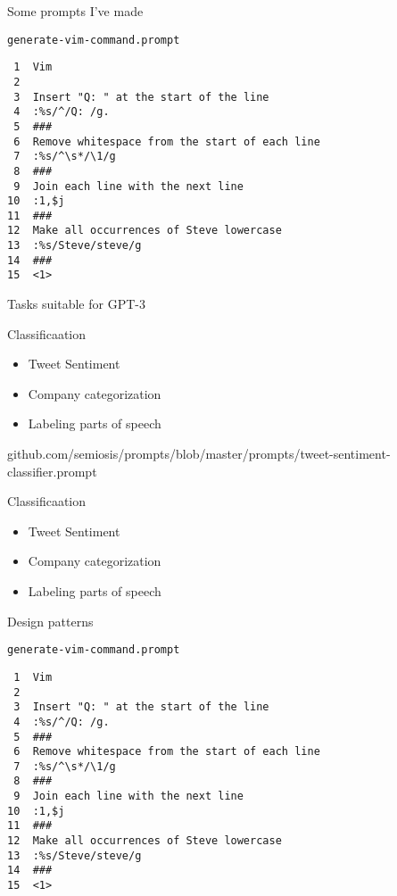 \documentclass[presentation]{beamer}
\begin{document}
\begin{frame}[label={sec:org28ea63d},fragile]{Some prompts I've made}
 \begin{block}{\texttt{generate-vim-command.prompt}}
{\footnotesize
\begin{verbatim}
 1  Vim
 2  
 3  Insert "Q: " at the start of the line
 4  :%s/^/Q: /g.
 5  ###
 6  Remove whitespace from the start of each line
 7  :%s/^\s*/\1/g
 8  ###
 9  Join each line with the next line
10  :1,$j
11  ###
12  Make all occurrences of Steve lowercase
13  :%s/Steve/steve/g
14  ###
15  <1>
\end{verbatim}
}
\end{block}
\end{frame}

\begin{frame}[label={sec:orga0109bc}]{Tasks suitable for GPT-3}
\begin{block}{Classificaation}
\begin{itemize}
\item Tweet Sentiment
\item Company categorization
\item Labeling parts of speech
\end{itemize}

{\footnotesize
github.com/semiosis/prompts/blob/master/prompts/tweet-sentiment-classifier.prompt
}
\end{block}

\begin{block}{Classificaation}
\begin{itemize}
\item Tweet Sentiment
\item Company categorization
\item Labeling parts of speech
\end{itemize}
\end{block}
\end{frame}

\begin{frame}[label={sec:orgafd785e},fragile]{Design patterns}
 \begin{block}{\texttt{generate-vim-command.prompt}}
{\footnotesize
\begin{verbatim}
 1  Vim
 2  
 3  Insert "Q: " at the start of the line
 4  :%s/^/Q: /g.
 5  ###
 6  Remove whitespace from the start of each line
 7  :%s/^\s*/\1/g
 8  ###
 9  Join each line with the next line
10  :1,$j
11  ###
12  Make all occurrences of Steve lowercase
13  :%s/Steve/steve/g
14  ###
15  <1>
\end{verbatim}
}
\end{block}
\end{frame}
\end{document}
